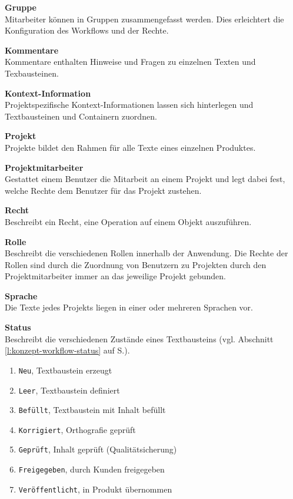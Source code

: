 \textsf{\textbf{Gruppe}}\\Mitarbeiter können in Gruppen zusammengefasst werden. Dies erleichtert die Konfiguration des Workflows und der Rechte.

\textsf{\textbf{Kommentare}}\\Kommentare enthalten Hinweise und Fragen zu einzelnen Texten und Texbausteinen.

\textsf{\textbf{Kontext-Information}}\\Projektspezifische Kontext-Informationen lassen sich hinterlegen und Textbausteinen und Containern zuordnen.

\textsf{\textbf{Projekt}}\\Projekte bildet den Rahmen für alle Texte eines einzelnen Produktes.

\textsf{\textbf{Projektmitarbeiter}}\\Gestattet einem Benutzer die Mitarbeit an einem Projekt und legt dabei fest, welche Rechte dem Benutzer für das Projekt zustehen.

\textsf{\textbf{Recht}}\\Beschreibt ein Recht, eine Operation auf einem Objekt auszuführen.

\textsf{\textbf{Rolle}}\\Beschreibt die verschiedenen Rollen innerhalb der Anwendung. Die Rechte der Rollen sind durch die Zuordnung von Benutzern zu Projekten durch den Projektmitarbeiter immer an das jeweilige Projekt gebunden.

\textsf{\textbf{Sprache}}\\Die Texte jedes Projekts liegen in einer oder mehreren Sprachen vor.

\textsf{\textbf{Status}}\\Beschreibt die verschiedenen Zustände eines Textbausteins (vgl. Abschnitt \ref{l:konzept-workflow-status} auf S.\pageref{l:konzept-workflow-status}).

\begin{enumerate}\itemsep -5pt
\item \texttt{Neu}, Textbaustein erzeugt
\item \texttt{Leer}, Textbaustein definiert
\item \texttt{Befüllt}, Textbaustein mit Inhalt befüllt
\item \texttt{Korrigiert}, Orthografie geprüft
\item \texttt{Geprüft}, Inhalt geprüft (Qualitätsicherung)
\item \texttt{Freigegeben}, durch Kunden freigegeben
\item \texttt{Veröffentlicht}, in Produkt übernommen
\end{enumerate}

